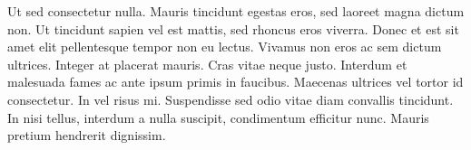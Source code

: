 Ut sed consectetur nulla. Mauris tincidunt egestas
eros, sed laoreet magna dictum non. Ut tincidunt
sapien vel est mattis, sed rhoncus eros viverra.
Donec et est sit amet elit pellentesque tempor non
eu lectus. Vivamus non eros ac sem dictum ultrices.
Integer at placerat mauris. Cras vitae neque justo.
Interdum et malesuada fames ac ante ipsum primis in
faucibus. Maecenas ultrices vel tortor id
consectetur. In vel risus mi. Suspendisse sed odio
vitae diam convallis tincidunt. In nisi tellus,
interdum a nulla suscipit, condimentum efficitur
nunc. Mauris pretium hendrerit dignissim.

